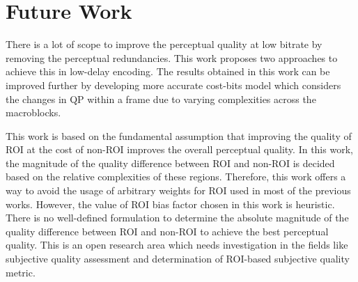\section{Future Work}
There is a lot of scope to improve the perceptual quality at low bitrate by removing the perceptual redundancies. This work proposes two approaches to achieve this in low-delay encoding. The results obtained in this work can be improved further by developing more accurate cost-bits model which considers the changes in QP within a frame due to varying complexities across the macroblocks. 

This work is based on the fundamental assumption that improving the quality of ROI at the cost of non-ROI improves the overall perceptual quality. In this work, the magnitude of the quality difference between ROI and non-ROI is decided based on the relative complexities of these regions. Therefore, this work offers a way to avoid the usage of arbitrary weights for ROI used in most of the previous works. However, the value of ROI bias factor chosen in this work is heuristic. There is no well-defined formulation to determine the absolute magnitude of the quality difference between ROI and non-ROI to achieve the best perceptual quality. This is an open research area which needs investigation in the fields like subjective quality assessment and determination of ROI-based subjective quality metric.